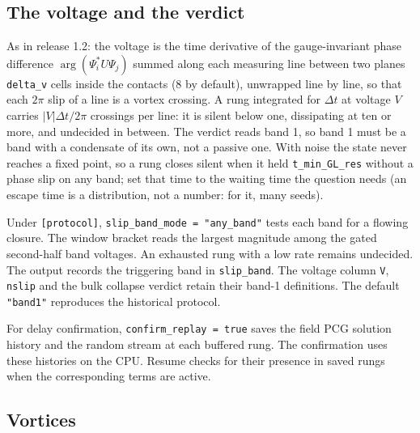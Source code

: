 \documentclass[11pt,a4paper]{article}
\newcommand{\code}[1]{\texttt{#1}}
\begin{document}
\subsection{The voltage and the verdict}

As in release 1.2: the voltage is the time derivative of the gauge-invariant phase difference
$\arg(\Psi_i^*U\Psi_j)$ summed along each measuring line between two planes \code{delta\_v} cells inside the contacts
(8 by default), unwrapped line by line, so that each $2\pi$ slip of a line is a vortex crossing. A rung integrated for
$\Delta t$ at voltage $V$ carries $|V|\Delta t/2\pi$ crossings per line: it is silent below one, dissipating at ten or
more, and undecided in between. The verdict reads band 1, so band 1 must be a band with a condensate of its own, not a
passive one. With noise the state never reaches a fixed point, so a rung closes silent when it held \code{t\_min\_GL\_res}
without a phase slip on any band; set that time to the waiting time the question needs (an escape time is a distribution, not a
number: for it, many seeds).

Under \code{[protocol]}, \code{slip\_band\_mode = "any\_band"} tests each band for a flowing closure.
The window bracket reads the largest magnitude among the gated second-half band voltages.
An exhausted rung with a low rate remains undecided. The output records the triggering band in
\code{slip\_band}. The voltage column \code{V}, \code{nslip} and the bulk collapse verdict retain their
band-1 definitions. The default \code{"band1"} reproduces the historical protocol.

For delay confirmation, \code{confirm\_replay = true} saves the field PCG solution history and the
random stream at each buffered rung. The confirmation uses these histories on the CPU. Resume
checks for their presence in saved rungs when the corresponding terms are active.

\subsection{Vortices}
\end{document}
